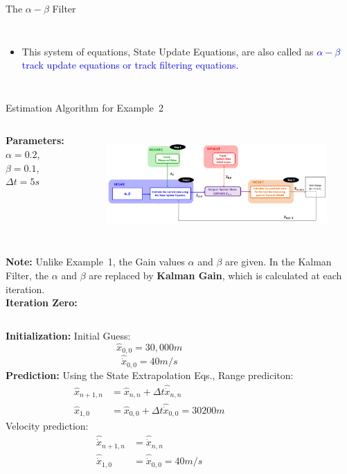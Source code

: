\begin{frame}{The $\alpha-\beta$ Filter}
\begin{columns}
\begin{itemize}
        \item This system of equations, State Update Equations, are also called as \textcolor{blue}{$\alpha-\beta$ track update equations or track filtering equations}. 
        
    \end{itemize}
    
    \end{columns}  
\end{frame}
\begin{frame}{Estimation Algorithm for Example~2}
\begin{columns}
    \textbf{Parameters:}\\
    $\alpha=0.2$,\\ $\beta=0.1$,\\ $\Delta t = 5s$
        \begin{figure}
	    \centering
	    \includegraphics[width=1\textwidth]{Figures/Chapter1/ex2_estimationAlgorithm.png}
	    \label{fig:ex2_estimationAlgorithm}
	    	\vspace{-8pt}
	\end{figure}
\end{columns}
\textbf{Note:} Unlike Example~1, the Gain values $\alpha$ and $\beta$ are given. In the Kalman Filter, the $\alpha$ and $\beta$ are replaced by \textbf{Kalman Gain}, which is calculated at each iteration.\\  
\textbf{Iteration Zero:}
\vspace{5pt}
\begin{columns}
    \textbf{Initialization:} Initial Guess:
        $$\hat{x}_{0,0} = 30,000m$$
        $$\hat{\dot{x}}_{0,0} = 40m/s$$
    \textbf{Prediction:} Using the State Extrapolation Eqs., Range prediciton:
    \begin{align*}
        \hat{x}_{n+1,n} & = \hat{x}_{n,n} + \Delta t \hat{\dot{x}}_{n,n}\\
        \hat{x}_{1,0}   & = \hat{x}_{0,0} + \Delta t \hat{\dot{x}}_{0,0} = 30200m
    \end{align*}    
    Velocity prediction:
    \begin{align*}
        \hat{\dot{x}}_{n+1,n} & = \hat{\dot{x}}_{n,n}\\
        \hat{\dot{x}}_{1,0}   & = \hat{\dot{x}}_{0,0} = 40m/s
    \end{align*}

\end{columns}



\end{frame}
